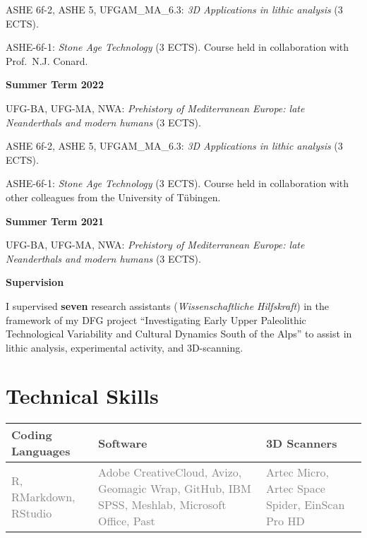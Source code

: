 \documentclass[11pt,a4paper,]{awesome-cv}
\begin{document}
ASHE 6f-2, ASHE 5, UFGAM\_MA\_6.3: \emph{3D Applications in lithic
analysis} (3 ECTS).

ASHE-6f-1: \emph{Stone Age Technology} (3 ECTS). Course held in
collaboration with Prof.~N.J. Conard.

\setlength{\leftskip}{0cm}

\textbf{Summer Term 2022}

\setlength{\leftskip}{1cm}

UFG-BA, UFG-MA, NWA: \emph{Prehistory of Mediterranean Europe: late
Neanderthals and modern humans} (3 ECTS).

ASHE 6f-2, ASHE 5, UFGAM\_MA\_6.3: \emph{3D Applications in lithic
analysis} (3 ECTS).

ASHE-6f-1: \emph{Stone Age Technology} (3 ECTS). Course held in
collaboration with other colleagues from the University of Tübingen.

\setlength{\leftskip}{0cm}

\textbf{Summer Term 2021}

\setlength{\leftskip}{1cm}

UFG-BA, UFG-MA, NWA: \emph{Prehistory of Mediterranean Europe: late
Neanderthals and modern humans} (3 ECTS).

\setlength{\leftskip}{0cm}

\textbf{Supervision}

\setlength{\leftskip}{1cm}

I supervised \textbf{seven} research assistants (\emph{Wissenschaftliche
Hilfskraft}) in the framework of my DFG project ``Investigating Early
Upper Paleolithic Technological Variability and Cultural Dynamics South
of the Alps'' to assist in lithic analysis, experimental activity, and
3D-scanning.

\setlength{\leftskip}{0cm}

\hypertarget{technical-skills}{%
\section{Technical Skills}\label{technical-skills}}

\begin{table}[!h]
\centering\begingroup\fontsize{9}{11}\selectfont

\begin{tabular}{>{\centering\arraybackslash}p{4.75cm}>{\centering\arraybackslash}p{4.75cm}>{\centering\arraybackslash}p{4.75cm}}
\toprule
\textcolor[HTML]{414141}{\textbf{Coding Languages}} & \textcolor[HTML]{414141}{\textbf{Software}} & \textcolor[HTML]{414141}{\textbf{3D Scanners}}\\
\midrule
\textcolor[HTML]{7f7f7f}{R, RMarkdown, RStudio} & \textcolor[HTML]{7f7f7f}{Adobe CreativeCloud, Avizo, Geomagic Wrap, GitHub, IBM SPSS, Meshlab, Microsoft Office, Past} & \textcolor[HTML]{7f7f7f}{Artec Micro, Artec Space Spider, EinScan Pro HD}\\
\bottomrule
\end{tabular}
\endgroup{}
\end{table}
\end{document}
